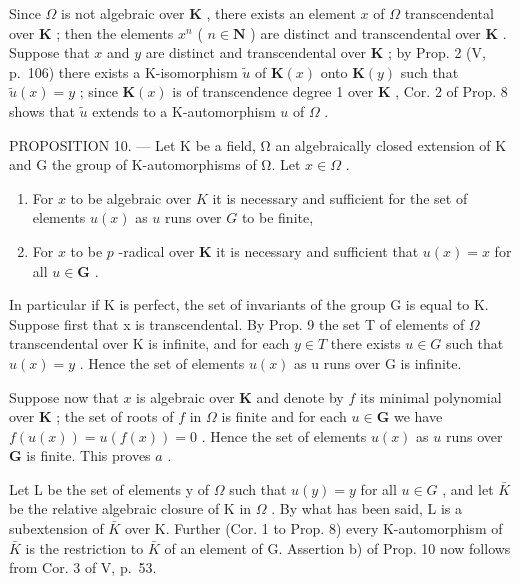 Since \(\Omega\) is not algebraic over \(\mathbf{K}\) , there exists an element \(x\) of \(\Omega\) transcendental over \(\mathbf{K}\) ; then the elements \(x^n\) ( \(n \in \mathbf{N}\) ) are distinct and transcendental over \(\mathbf{K}\) . Suppose that \(x\) and \(y\) are distinct and transcendental over \(\mathbf{K}\) ; by Prop. 2 (V, p.~106) there exists a K-isomorphism \(\tilde{u}\) of \(\mathbf{K}(x)\) onto \(\mathbf{K}(y)\) such that \(\tilde{u}(x) = y\) ; since \(\mathbf{K}(x)\) is of transcendence degree 1 over \(\mathbf{K}\) , Cor. 2 of Prop. 8 shows that \(\tilde{u}\) extends to a K-automorphism \(u\) of \(\Omega\) .

PROPOSITION 10. --- Let K be a field, Ω an algebraically closed extension of K and G the group of K-automorphisms of Ω. Let \(x \in \Omega\) .

\begin{enumerate}
\def\labelenumi{\alph{enumi})}
\item
  For \(x\) to be algebraic over \(K\) it is necessary and sufficient for the set of elements \(u(x)\) as \(u\) runs over \(G\) to be finite,
\item
  For \(x\) to be \(p\) -radical over \(\mathbf{K}\) it is necessary and sufficient that \(u(x) = x\) for all \(u \in \mathbf{G}\) .
\end{enumerate}

In particular if K is perfect, the set of invariants of the group G is equal to K. Suppose first that x is transcendental. By Prop. 9 the set T of elements of \(\Omega\) transcendental over K is infinite, and for each \(y \in T\) there exists \(u \in G\) such that \(u(x) = y\) . Hence the set of elements \(u(x)\) as u runs over G is infinite.

Suppose now that \(x\) is algebraic over \(\mathbf{K}\) and denote by \(f\) its minimal polynomial over \(\mathbf{K}\) ; the set of roots of \(f\) in \(\Omega\) is finite and for each \(u \in \mathbf{G}\) we have \(f(u(x)) = u(f(x)) = 0\) . Hence the set of elements \(u(x)\) as \(u\) runs over \(\mathbf{G}\) is finite. This proves \(a\) .

Let L be the set of elements y of \(\Omega\) such that \(u(y)=y\) for all \(u\in G\) , and let \(\bar{K}\) be the relative algebraic closure of K in \(\Omega\) . By what has been said, L is a subextension of \(\bar{K}\) over K. Further (Cor. 1 to Prop. 8) every K-automorphism of \(\bar{K}\) is the restriction to \(\bar{K}\) of an element of G. Assertion b) of Prop. 10 now follows from Cor. 3 of V, p.~53.

